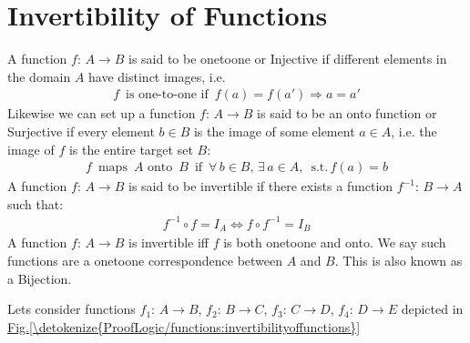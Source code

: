 \documentclass[letterpaper,10pt,english]{jupyterBook}
\begin{document}
\section{Invertibility of Functions}
\label{\detokenize{ProofLogic/functions:invertibility-of-functions}}
\sphinxAtStartPar
A function \(f:\,A \rightarrow B\) is said to be one\sphinxhyphen{}to\sphinxhyphen{}one or Injective  if different elements in the domain \(A\) have distinct images, i.e.
\begin{equation*}
\begin{split}f\,\text{ is one-to-one if }\,f(a) = f(a') \Rightarrow a = a'\end{split}
\end{equation*}
\sphinxAtStartPar
Likewise we can set up a function \(f:\,A \rightarrow B\) is said to be an onto function or Surjective if every element \(b \in B\) is the image
of some element \(a \in A\), i.e. the image of \(f\) is the entire target set \(B\):
\begin{equation*}
\begin{split}f\,\text{ maps }\,A \text{ onto }\,B\,\text{ if }\,\forall\, b \in B,\, \exists \,a \in A, \,\text{ s.t.}\, f(a) = b\end{split}
\end{equation*}
\sphinxAtStartPar
A function \(f:\,A \rightarrow B\) is said to be invertible if there exists a function \(f^{-1}:\, B\rightarrow A\) such that:
\begin{equation*}
\begin{split}f^{-1} \circ f = I_A \Longleftrightarrow f \circ f^{-1} = I_B\end{split}
\end{equation*}
\sphinxAtStartPar
A function \(f:\,A \rightarrow B\) is invertible iff \(f\) is both one\sphinxhyphen{}to\sphinxhyphen{}one and onto.  We say such functions are a one\sphinxhyphen{}to\sphinxhyphen{}one correspondence
between \(A\) and \(B\).  This is also known as a Bijection.

\sphinxAtStartPar
Lets consider functions \(f_1:\,A \rightarrow B\), \(f_2:\,B \rightarrow C\), \(f_3:\,C \rightarrow D\), \(f_4:\,D \rightarrow E\) depicted in \hyperref[\detokenize{ProofLogic/functions:invertibilityoffunctions}]{Fig.\@ \ref{\detokenize{ProofLogic/functions:invertibilityoffunctions}}}
\end{document}
